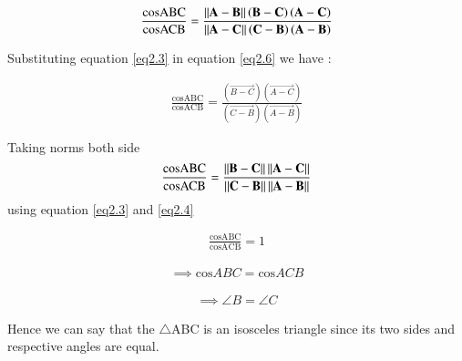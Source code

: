 \documentclass[journal,12pt,twocolumn]{IEEEtran}
\begin{document}
  \begin{align}
 \frac{\text{cosABC}}{\text{cosACB}} = \frac{ \left\lVert\mathbf{A-B}\right\rVert  \left( \mathbf{B - C } \right)  \left( \mathbf{A - C } \right) }{\left\lVert \mathbf{A-C}\right\rVert  \left( \mathbf{C - B } \right)  \left( \mathbf{A - B } \right)   } \label{eq2.6}
 \end{align} 
 
 
 Substituting equation \ref{eq2.3} in equation \ref{eq2.6} we have :
 
    \begin{align}
  \frac{\text{cosABC}}{\text{cosACB}} = \frac{ \left( \vec{B - C } \right)  \left( \vec{A - C } \right) }{ \left( \vec{C - B } \right)  \left( \vec{A - B } \right)   } \label{eq2.7}
  \end{align}
  
  Taking norms both side 
  \begin{align}
  \frac{\text{cosABC}}{\text{cosACB}} = \frac{ \left\lVert\mathbf{B - C }\right\rVert \left\lVert\mathbf{A - C } \right\rVert } { \left\lVert\mathbf{C - B }\right\rVert  \left\lVert\mathbf{A - B } \right\rVert } \label{eq2.8}
  \end{align}
   using equation \ref{eq2.3} and \ref{eq2.4} 
  
    \begin{align}
  \frac{\text{cosABC}}{\text{cosACB}} = 1 \label{eq2.9}
  \end{align}
  
   \begin{align}
  \implies   \text{cos}ABC =  \text{cos}ACB \label{eq2.10}
  \end{align}
  
     \begin{align}
  \implies \angle{B}   =  \angle{C} \label{eq2.11}
  \end{align}
  
  Hence we can say that the $\triangle$ABC is an isosceles triangle since its two sides and respective angles are equal.
\end{document}
